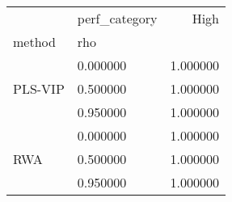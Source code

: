 \begin{tabular}{llr}
\toprule
 & perf_category & High \\
method & rho &  \\
\midrule
\multirow[t]{3}{*}{PLS-VIP} & 0.000000 & 1.000000 \\
 & 0.500000 & 1.000000 \\
 & 0.950000 & 1.000000 \\
\cline{1-3}
\multirow[t]{3}{*}{RWA} & 0.000000 & 1.000000 \\
 & 0.500000 & 1.000000 \\
 & 0.950000 & 1.000000 \\
\cline{1-3}
\bottomrule
\end{tabular}
